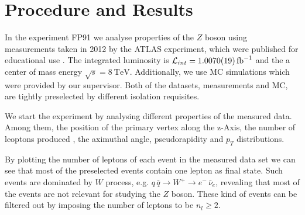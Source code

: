\documentclass[11 pt]{article}
\begin{document}
\section{Procedure and Results}
In the experiment FP91 we analyse properties of the $Z$ boson using measurements taken in 2012 by the ATLAS experiment, which were published for educational use \footnotemark {} \footnotemark {}. The integrated luminosity is $\mathcal{L}_{int} = \SI{1.007\pm 0.0019}{\femto\barn^{-1}}$ and the a center of mass energy $\sqrt{s} = \SI{8}{\tera\electronvolt}$. Additionally, we use MC simulations which were provided by our supervisor. Both of the datasets, measurements and MC, are tightly preselected by different isolation requisites.

We start the experiment by analysing different properties of the measured data. Among them, the position of the primary vertex along the z-Axis, the number of leoptons produced , the aximuthal angle, pseudorapidity and $p_T$ distributions.

By plotting the number of leptons of each event in the measured data set we can see that most of the preselected events contain one lepton as final state. Such events are dominated by $W$ process, e.g. $q\, \bar{q} \to W^+ \to e^-\, \bar{\nu}_e$, revealing that most of the events are not relevant for studying the $Z$ boson. These kind of events can be filtered out by imposing the number of leptons to be $n_l \geq 2$. 
\end{document}
